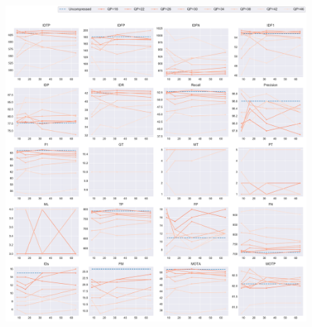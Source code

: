 \begin{figure}[!htbp]
\centering
\includegraphics[width=1.0\linewidth]{img/appendix/ParkScene_all_multiplots_msr.pdf}
\caption[Result of all object classes in Class B ParkScene with Horizontal Axis of MSR]{}
\label{fig:ParkScene_all_msr}
\end{figure}



